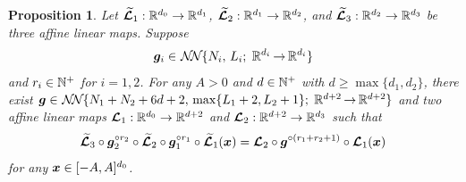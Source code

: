 \documentclass[nohyperref]{article}
\theoremstyle{plain}
\newtheorem{proposition}[theorem]{Proposition}
\theoremstyle{definition}
\theoremstyle{remark}
\begin{document}
\begin{proposition}
	\label{prop:two:blocks:three:affine}
	Let $\bmtildecalL_1:\R^{d_0}\to \R^{d_1}$, $\bmtildecalL_2:\R^{d_1}\to \R^{d_2}$, and $\bmtildecalL_3:\R^{d_2}\to\R^{d_3}$ be three affine linear maps.  Suppose 
 \begin{equation*}
     \bmg_i\in \nn{N_i}{L_i}{d_i}{d_i}
 \end{equation*}
 and $r_i\in \N^+$ for $i=1,2$.
	For any $A>0$ and $d\in\N^+$ with $d\ge\max\{d_1,d_2\}$, there exist
$
	    \bmg	\in		\nn{N_1+N_2+6d+2}{\max\{L_1+2,L_2+1\}}{d+2}{d+2}
	$	and two affine linear maps $\bmcalL_1:\R^{d_0}\to \R^{d+2}$ and $\bmcalL_2: \R^{d+2} \to \R^{d_3}$
	such that
	\begin{equation*}
		{\bm{\mathcal{\widetilde{L}}}}_3\circ {\bm{g}}_2^{\circ r_2}\circ {\bm{\mathcal{\widetilde{L}}}}_2\circ  {\bm{g}}_1^{\circ r_1}\circ {\bm{\mathcal{\widetilde{L}}}}_1 ({\bm{x}})
		={\bm{\mathcal{L}}}_2\circ {\bm{g}}^{\circ (r_1+r_2+1)}\circ {\bm{\mathcal{L}}}_1({\bm{x}})
	\end{equation*} 
	for any ${\bm{x}} \in [-A,A]^{d_0}$.
\end{proposition}
\end{document}

